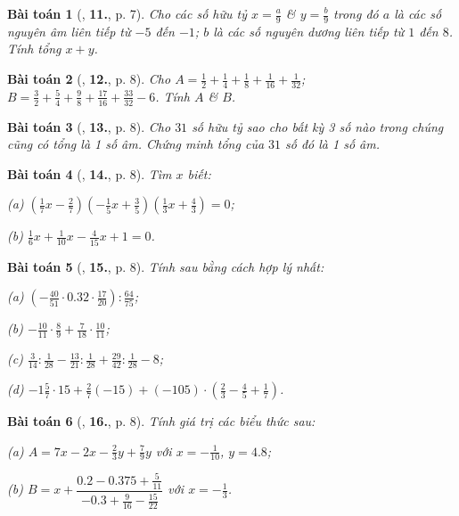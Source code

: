 \documentclass{article}
\numberwithin{equation}{section}
\newtheorem{baitoan}{Bài toán}[section]
\begin{document}
\begin{baitoan}[\cite{Tuyen_Toan_7}, \textbf{11.}, p. 7]
	Cho các số hữu tỷ $x = \frac{a}{9}$ \& $y = \frac{b}{9}$ trong đó $a$ là các số nguyên âm liên tiếp từ $-5$ đến $-1$; $b$ là các số nguyên dương liên tiếp từ $1$ đến $8$. Tính tổng $x + y$.
\end{baitoan}

\begin{baitoan}[\cite{Tuyen_Toan_7}, \textbf{12.}, p. 8]
	Cho $A = \frac{1}{2} + \frac{1}{4} + \frac{1}{8} + \frac{1}{16} + \frac{1}{32}$; $B = \frac{3}{2} + \frac{5}{4} + \frac{9}{8} + \frac{17}{16} + \frac{33}{32} - 6$. Tính $A$ \& $B$.
\end{baitoan}

\begin{baitoan}[\cite{Tuyen_Toan_7}, \textbf{13.}, p. 8]
	Cho $31$ số hữu tỷ sao cho bất kỳ 3 số nào trong chúng cũng có tổng là 1 số âm. Chứng minh tổng của $31$ số đó là 1 số âm.
\end{baitoan}

\begin{baitoan}[\cite{Tuyen_Toan_7}, \textbf{14.}, p. 8]
	Tìm $x$ biết:
	\begin{enumerate*}
		\item[(a)] $\left(\frac{1}{7}x - \frac{2}{7}\right)\left(-\frac{1}{5}x + \frac{3}{5}\right)\left(\frac{1}{3}x + \frac{4}{3}\right) = 0$;
		\item[(b)] $\frac{1}{6}x + \frac{1}{10}x - \frac{4}{15}x + 1 = 0$.
	\end{enumerate*}
\end{baitoan}

\begin{baitoan}[\cite{Tuyen_Toan_7}, \textbf{15.}, p. 8]
	Tính sau bằng cách hợp lý nhất:
	\begin{enumerate*}
		\item[(a)] $\left(-\frac{40}{51}\cdot 0.32\cdot\frac{17}{20}\right):\frac{64}{75}$;
		\item[(b)] $-\frac{10}{11}\cdot\frac{8}{9} + \frac{7}{18}\cdot\frac{10}{11}$;
		\item[(c)] $\frac{3}{14}:\frac{1}{28} - \frac{13}{21}:\frac{1}{28} + \frac{29}{42}:\frac{1}{28} - 8$;
		\item[(d)] $-1\frac{5}{7}\cdot 15 + \frac{2}{7}(-15) + (-105)\cdot\left(\frac{2}{3} - \frac{4}{5} + \frac{1}{7}\right)$.
	\end{enumerate*}
\end{baitoan}

\begin{baitoan}[\cite{Tuyen_Toan_7}, \textbf{16.}, p. 8]
	Tính giá trị các biểu thức sau:
	\begin{enumerate*}
		\item[(a)] $A = 7x - 2x - \frac{2}{3}y + \frac{7}{9}y$ với $x = -\frac{1}{10}$, $y = 4.8$;
		\item[(b)] $B = x + \dfrac{0.2 - 0.375 + \frac{5}{11}}{-0.3 + \frac{9}{16} - \frac{15}{22}}$ với $x = -\frac{1}{3}$. 
	\end{enumerate*}
\end{baitoan}
\end{document}
